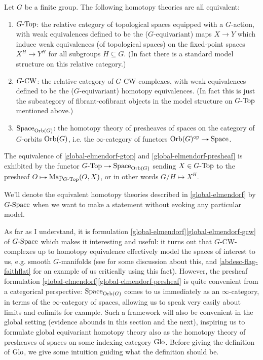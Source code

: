 \begin{theorem}[Elmendorf]
  \label{global-elmendorf}
  Let $G$ be a finite group. The following homotopy theories are all
  equivalent:
  \begin{enumerate}
  \item \label{global-elmendorf-gtop} $G\text{-}\mathrm{Top}$: the relative
    category of topological spaces equipped with a $G$-action, with
    weak equivalences defined to be the ($G$-equivariant) maps
    $X \to Y$ which induce weak equivalences (of topological spaces)
    on the fixed-point spaces $X^H \to Y^H$ for all subgroups
    $H \subseteq G$. (In fact there is a standard model structure on
    this relative category.)
  \item \label{global-elmendorf-gcw} $G\text{-}\mathrm{CW}$: the relative
    category of $G$-CW-complexes, with weak equivalences defined to be
    the ($G$-equivariant) homotopy equivalences. (In fact this is just
    the subcategory of fibrant-cofibrant objects in the model
    structure on $G\text{-}\mathrm{Top}$ mentioned above.)
  \item \label{global-elmendorf-presheaf} $\mathrm{Space}_{\mathrm{Orb}(G)}$: the
    homotopy theory of presheaves of spaces on the category of
    $G$-orbits $\mathrm{Orb}(G)$, i.e. the $\infty$-category of functors
    $\Orb(G)^\op \to \Space$.
  \end{enumerate}
  The equivalence of \cref{global-elmendorf-gtop} and
  \cref{global-elmendorf-presheaf} is exhibited by the functor
  $G\dash\Top \to \Space_{\Orb(G)}$ sending $X \in G\text{-}\mathrm{Top}$ to the
  presheaf $O \mapsto \Map_{G\dash\Top}(O,X)$, or in other words
  $G/H \mapsto X^H$.
\end{theorem}

\begin{notation}
  \label{global-gspace}
  We'll denote the equivalent homotopy theories described in
  \cref{global-elmendorf} by $G\text{-}\mathrm{Space}$ when we want to make a
  statement without evoking any particular model.
\end{notation}

As far as I understand, it is formulation
\cref{global-elmendorf}\cref{global-elmendorf-gcw} of $G\text{-}\mathrm{Space}$
which makes it interesting and useful: it turns out that
$G$-CW-complexes up to homotopy equivalence effectively model the
spaces of interest to us, e.g. smooth $G$-manifolds (see
\cite{mo-equivhmptygrps} for some discussion about this, and
\cref{abdesc-flag-faithflat} for an example of us critically using
this fact). However, the presheaf formulation
\cref{global-elmendorf}\cref{global-elmendorf-presheaf} is quite
convenient from a categorical perspective: $\mathrm{Space}_{\mathrm{Orb}(G)}$ comes to
us immediately as an $\infty$-category, in terms of the
$\infty$-category of spaces, allowing us to speak very easily about
limits and colimits for example. Such a framework will also be
convenient in the global setting (evidence abounds in this section and
the next), inspiring us to formulate global equivariant homotopy
theory also as the homotopy theory of presheaves of spaces on some
indexing category $\mathrm{Glo}$. Before giving the definition of $\mathrm{Glo}$, we
give some intuition guiding what the definition should be.

